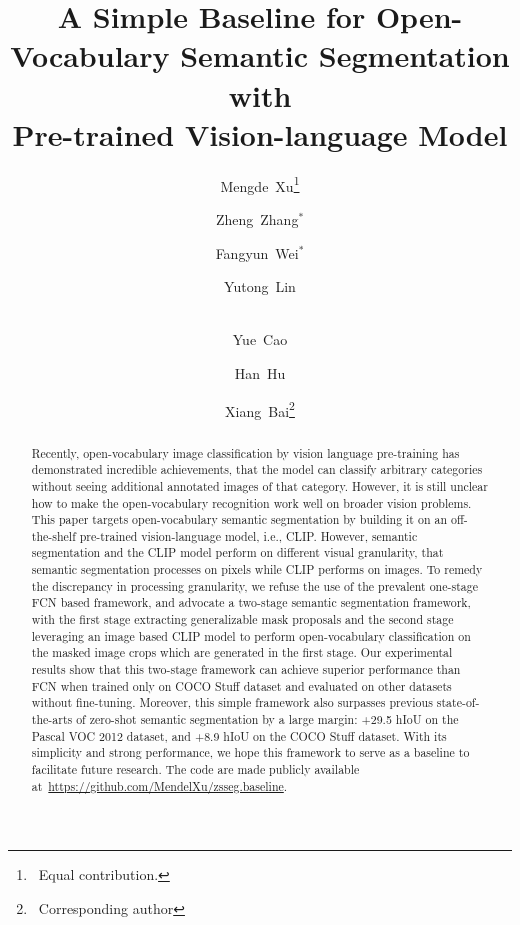 \documentclass[runningheads]{llncs}
\begin{document}
\pagestyle{headings}
\mainmatter
\def\ECCVSubNumber{6275}  

\authorrunning{ }
\titlerunning{ }
\title{A Simple Baseline for Open-Vocabulary Semantic Segmentation with \\Pre-trained Vision-language Model} \author{
Mengde~Xu\thanks{~Equal contribution.} \and 
Zheng~Zhang$^\ast$ \and 
Fangyun~Wei$^\ast$ \and 
Yutong~Lin \and \\
Yue~Cao \and
Han~Hu \and
Xiang~Bai\thanks{~Corresponding author}
}





\maketitle

\begin{abstract}
Recently, open-vocabulary image classification by vision language pre-training has demonstrated incredible achievements, that the model can classify arbitrary categories without seeing additional annotated images of that category. However, it is still unclear how to make the open-vocabulary recognition work well on broader vision problems. This paper targets open-vocabulary semantic segmentation by building it on an off-the-shelf pre-trained vision-language model, i.e., CLIP. However, semantic segmentation and the CLIP model perform on different visual granularity, that semantic segmentation processes on pixels while CLIP performs on images. To remedy the discrepancy in processing granularity, we refuse the use of the prevalent one-stage FCN based framework, and advocate a two-stage semantic segmentation framework, with the first stage extracting generalizable mask proposals and the second stage leveraging an image based CLIP model to perform open-vocabulary classification on the masked image crops which are generated in the first stage. Our experimental results show that this two-stage framework can achieve superior performance than FCN when trained only on COCO Stuff dataset and evaluated on other datasets without fine-tuning. Moreover, this simple framework also surpasses previous state-of-the-arts of zero-shot semantic segmentation by a large margin: +29.5 hIoU on the Pascal VOC 2012 dataset, and +8.9 hIoU on the COCO Stuff dataset. With its simplicity and strong performance, we hope this framework to serve as a baseline to facilitate future research. The code are made publicly available at~\url{https://github.com/MendelXu/zsseg.baseline}. 
\end{abstract}
\end{document}
